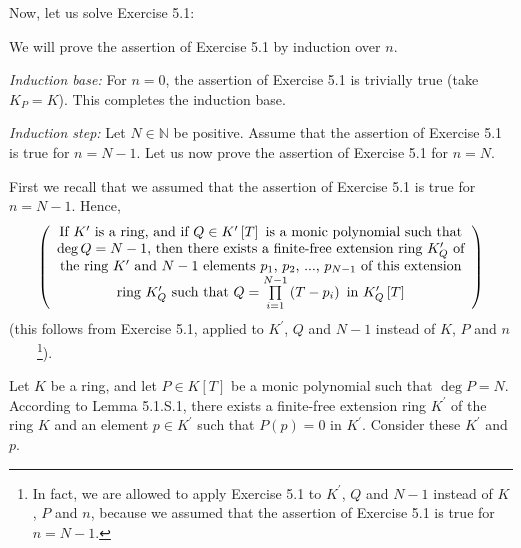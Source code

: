 \documentclass[numbers=enddot,12pt,final,onecolumn,notitlepage]{scrartcl}%
\begin{document}
Now, let us solve Exercise 5.1:

We will prove the assertion of Exercise 5.1 by induction over $n$.

\textit{Induction base:} For $n=0$, the assertion of Exercise 5.1 is trivially
true (take $K_{P}=K$). This completes the induction base.

\textit{Induction step:} Let $N\in\mathbb{N}$ be positive. Assume that the
assertion of Exercise 5.1 is true for $n=N-1$. Let us now prove the assertion
of Exercise 5.1 for $n=N$.

First we recall that we assumed that the assertion of Exercise 5.1 is true for
$n=N-1$. Hence,%
\begin{equation}
\left(
\begin{array}
[c]{c}%
\text{If }K^{\prime}\text{ is a ring, and if }Q\in K^{\prime}\left[  T\right]
\text{ is a monic polynomial such that}\\
\deg Q=N-1\text{, then there exists a finite-free extension ring }%
K_{Q}^{\prime}\text{ of}\\
\text{the ring }K^{\prime}\text{ and }N-1\text{ elements }p_{1}\text{, }%
p_{2}\text{, }...\text{, }p_{N-1}\text{ of this extension}\\
\text{ring }K_{Q}^{\prime}\text{ such that }Q=\prod\limits_{i=1}^{N-1}\left(
T-p_{i}\right)  \text{ in }K_{Q}^{\prime}\left[  T\right]
\end{array}
\right)  \label{5.1.sol.1}%
\end{equation}
(this follows from Exercise 5.1, applied to $K^{\prime}$, $Q$ and $N-1$
instead of $K$, $P$ and $n$\ \ \ \ \footnote{In fact, we are allowed to apply
Exercise 5.1 to $K^{\prime}$, $Q$ and $N-1$ instead of $K$, $P$ and $n$,
because we assumed that the assertion of Exercise 5.1 is true for $n=N-1$.}).

Let $K$ be a ring, and let $P\in K\left[  T\right]  $ be a monic polynomial
such that $\deg P=N$. According to Lemma 5.1.S.1, there exists a finite-free
extension ring $K^{\prime}$ of the ring $K$ and an element $p\in K^{\prime}$
such that $P\left(  p\right)  =0$ in $K^{\prime}$. Consider these $K^{\prime}$
and $p$.
\end{document}
